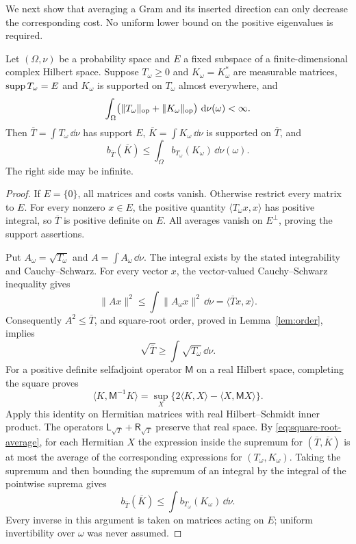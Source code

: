 We next show that averaging a Gram and its inserted direction can
only decrease the corresponding cost.  No uniform lower bound on
the positive eigenvalues is required.

\begin{lemma}
\label{lem:joint-convexity}
Let $(\Omega,\nu)$ be a probability space and $E$ a fixed subspace
of a finite-dimensional complex Hilbert space.  Suppose
$T_\omega\ge0$ and $K_\omega=K_\omega^*$ are measurable matrices,
$\operatorname{supp} T_\omega=E$ and $K_\omega$ is supported on $T_\omega$ almost
everywhere, and
\[
 \int_\Omega\bigl(\lVert T_\omega\rVert_{\mathrm{op}}
                  +\lVert K_\omega\rVert_{\mathrm{op}}\bigr)\,\,\mathrm d\nu(\omega)
 <\infty.
\]
Then $\overline T=\int T_\omega\,\dd\nu$ has support $E$,
$\overline K=\int K_\omega\,\dd\nu$ is supported on $\overline T$, and
\begin{equation}\label{eq:joint-convexity}
 b_{\overline T}(\overline K)
 \le\int_\Omega b_{T_\omega}(K_\omega)\,\dd\nu(\omega).
\end{equation}
The right side may be infinite.
\end{lemma}

\begin{proof}
If $E=\{0\}$, all matrices and costs vanish.  Otherwise restrict
every matrix to $E$.  For every nonzero $x\in E$, the positive
quantity $\langle T_\omega x,x\rangle$ has positive integral, so
$\overline T$ is positive definite on $E$.  All averages vanish on
$E^\perp$, proving the support assertions.

Put $A_\omega=\sqrt{T_\omega}$ and $A=\int A_\omega\,\dd\nu$.
The integral exists by the stated integrability and Cauchy--Schwarz.
For every vector $x$, the vector-valued Cauchy--Schwarz inequality
gives
\[
 \lVert Ax\rVert^2
 \le\int\lVert A_\omega x\rVert^2\,\dd\nu
 =\langle\overline T x,x\rangle.
\]
Consequently $A^2\le\overline T$, and square-root order,
proved in Lemma~\ref{lem:order}, implies
\begin{equation}\label{eq:square-root-average}
 \sqrt{\overline T}\ge\int\sqrt{T_\omega}\,\dd\nu.
\end{equation}
For a positive definite selfadjoint operator $\mathsf M$ on a real
Hilbert space, completing the square proves
\begin{equation}\label{eq:inverse-variational}
 \langle K,\mathsf M^{-1}K\rangle
 =\sup_X\{2\langle K,X\rangle-\langle X,\mathsf M X\rangle\}.
\end{equation}
Apply this identity on Hermitian matrices with real Hilbert--Schmidt
inner product.  The operators
$\mathsf L_{\sqrt T}+\mathsf R_{\sqrt T}$
preserve that real space.  By \eqref{eq:square-root-average}, for
each Hermitian $X$ the expression inside the supremum for
$(\overline T,\overline K)$ is at most the average of the
corresponding expressions for $(T_\omega,K_\omega)$.
Taking the supremum and then bounding the supremum of an integral
by the integral of the pointwise suprema gives
\[
 b_{\overline T}(\overline K)
 \le\int b_{T_\omega}(K_\omega)\,\dd\nu.
\]
Every inverse in this argument is taken on matrices acting on $E$;
uniform invertibility over $\omega$ was never assumed.
\end{proof}

